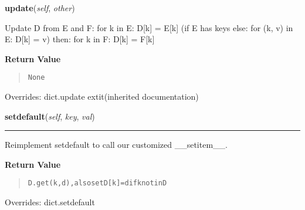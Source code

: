     \vspace{0.5ex}

    \begin{boxedminipage}{\textwidth}

    \raggedright \textbf{update}(\textit{self}, \textit{other})

    Update D from E and F: for k in E: D[k] = E[k] (if E has keys else: for
    (k, v) in E: D[k] = v) then: for k in F: D[k] = F[k]

    \vspace{1ex}

      \textbf{Return Value}
      \begin{quote}
\begin{alltt}
None
\end{alltt}

      \end{quote}

    \vspace{1ex}

      Overrides: dict.update 	extit{(inherited documentation)}

    \end{boxedminipage}

    \vspace{0.5ex}

    \begin{boxedminipage}{\textwidth}

    \raggedright \textbf{setdefault}(\textit{self}, \textit{key}, \textit{val})

    \vspace{-1.5ex}

    \rule{\textwidth}{0.5\fboxrule}
    Reimplement setdefault to call our customized \_\_setitem\_\_.

    \vspace{1ex}

      \textbf{Return Value}
      \begin{quote}
\begin{alltt}
D.get(k,d), also set D[k]=d if k not in D
\end{alltt}

      \end{quote}

    \vspace{1ex}

      Overrides: dict.setdefault

    \end{boxedminipage}

    \label{dict:__cmp__}

